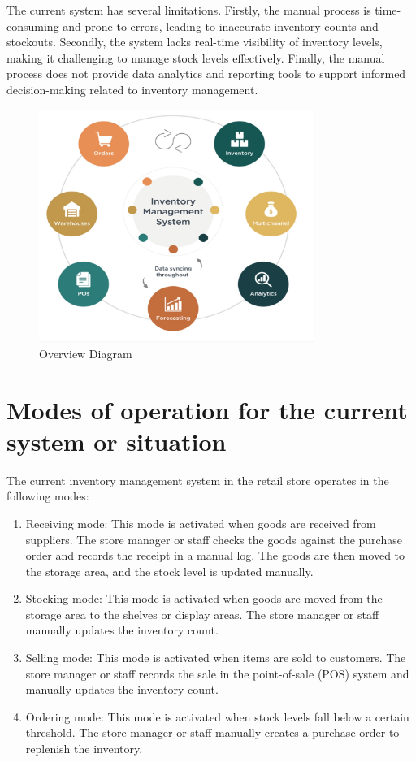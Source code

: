 The current system has several limitations. Firstly, the manual process is time-consuming and prone to errors, leading to inaccurate inventory counts and stockouts. Secondly, the system lacks real-time visibility of inventory levels, making it challenging to manage stock levels effectively. Finally, the manual process does not provide data analytics and reporting tools to support informed decision-making related to inventory management.\cite{OR2020}
\begin{figure}[H]
  \centering
   \includegraphics[width=9cm]{Figures/SpiritDiagram.jpeg}
  \caption{Overview Diagram}
\label{}
\end{figure}
\section{Modes of operation for the current system or situation \label{Section::Modesofoperationforthecurrentsystemorsituation}}
The current inventory management system in the retail store operates in the following modes:

\begin{enumerate}
    
\item Receiving mode: This mode is activated when goods are received from suppliers. The store manager or staff checks the goods against the purchase order and records the receipt in a manual log. The goods are then moved to the storage area, and the stock level is updated manually.

\item Stocking mode: This mode is activated when goods are moved from the storage area to the shelves or display areas. The store manager or staff manually updates the inventory count.

\item Selling mode: This mode is activated when items are sold to customers. The store manager or staff records the sale in the point-of-sale (POS) system and manually updates the inventory count.

\item Ordering mode: This mode is activated when stock levels fall below a certain threshold. The store manager or staff manually creates a purchase order to replenish the inventory.

\end{enumerate}

